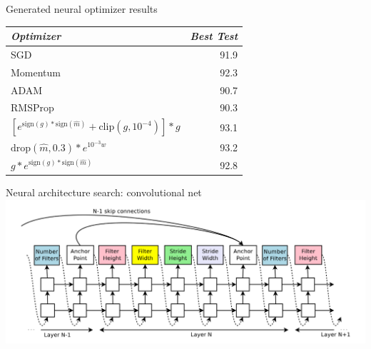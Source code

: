 \documentclass{beamer}
\begin{document}
{%
\begin{frame}{Generated neural optimizer results}
        \center{}
        \begin{tabular}{l r}
                \emph{Optimizer} & \emph{Best Test} \\
                \midrule{}
                SGD & 91.9 \\
                Momentum & 92.3 \\
                ADAM & 90.7 \\
                RMSProp & 90.3 \\
                \midrule{}
                $[e^{\textrm{sign}(g)*\textrm{sign}(\hat{m})} + \textrm{clip}(g, 10^{-4})]*g$ & 93.1 \\
                $\textrm{drop}(\hat{m}, 0.3)*e^{10^{-3}w}$ & 93.2 \\
                $g*e^{\textrm{sign}(g)*\textrm{sign}(\hat{m})}$ & 92.8
        \end{tabular}
\end{frame}
}

{%
\begin{frame}{Neural architecture search: convolutional net}
        \center{}
        \vspace{-1.5cm}
        \hspace*{-1.25cm}
        \includegraphics[scale=0.3]{data/neural_arch_convnet}
\end{frame}
}
\end{document}
